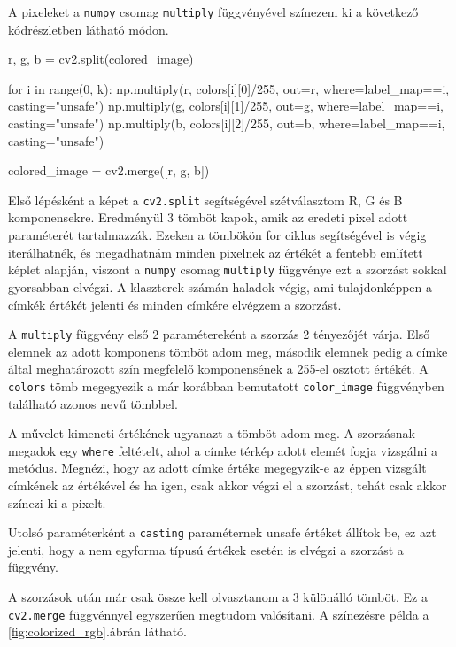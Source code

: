 A pixeleket a \texttt{numpy} csomag \texttt{multiply} függvényével színezem ki a következő kódrészletben látható módon.

\begin{python}
r, g, b = cv2.split(colored_image)

for i in range(0, k):
    np.multiply(r, colors[i][0]/255, out=r,
                where=label_map==i, casting="unsafe")
    np.multiply(g, colors[i][1]/255, out=g,
                where=label_map==i, casting="unsafe")
    np.multiply(b, colors[i][2]/255, out=b,
                where=label_map==i, casting="unsafe")

colored_image = cv2.merge([r, g, b])
\end{python}

Első lépésként a képet a \texttt{cv2.split} segítségével szétválasztom R, G és B komponensekre. Eredményül 3 tömböt kapok, amik az eredeti pixel adott paraméterét tartalmazzák. Ezeken a tömbökön for ciklus segítségével is végig iterálhatnék, és megadhatnám minden pixelnek az értékét a fentebb említett képlet alapján, viszont a \texttt{numpy} csomag \texttt{multiply} függvénye ezt a szorzást sokkal gyorsabban elvégzi. A klaszterek számán haladok végig, ami tulajdonképpen a címkék értékét jelenti és minden címkére elvégzem a szorzást.

A \texttt{multiply} függvény első 2 paramétereként a szorzás 2 tényezőjét várja. Első elemnek az adott komponens tömböt adom meg, második elemnek pedig a címke által meghatározott szín megfelelő komponensének a 255-el osztott értékét. A \texttt{colors} tömb megegyezik a már korábban bemutatott \texttt{color\_image} függvényben található azonos nevű tömbbel.

A művelet kimeneti értékének ugyanazt a tömböt adom meg. A szorzásnak megadok egy \texttt{where} feltételt, ahol a címke térkép adott elemét fogja vizsgálni a metódus. Megnézi, hogy az adott címke értéke megegyzik-e az éppen vizsgált címkének az értékével és ha igen, csak akkor végzi el a szorzást, tehát csak akkor színezi ki a pixelt.

Utolsó paraméterként a \texttt{casting} paraméternek unsafe értéket állítok be, ez azt jelenti, hogy a nem egyforma típusú értékek esetén is elvégzi a szorzást a függvény.

A szorzások után már csak össze kell olvasztanom a 3 különálló tömböt. Ez a \texttt{cv2.merge} függvénnyel egyszerűen megtudom valósítani. A színezésre példa a \ref{fig:colorized_rgb}.ábrán látható.

